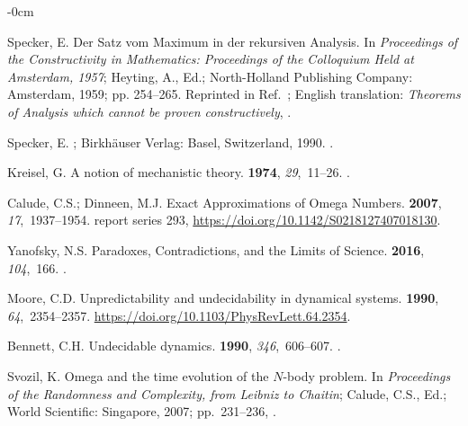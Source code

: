 \documentclass[axioms,article,accept,oneauthor,pdftex]{Definitions/mdpi}
\begin{document}
\begin{adjustwidth}{-\extralength}{0cm}
\begin{thebibliography}{999}
Specker, E.
\newblock Der {S}atz vom {M}aximum in der rekursiven {A}nalysis.
\newblock In \emph{Proceedings of the Constructivity in Mathematics: Proceedings of
  the Colloquium Held at Amsterdam, 1957}; Heyting, A., Ed.; North-Holland
  Publishing Company: Amsterdam, 1959; pp. 254--265.
\newblock Reprinted in Ref.~\cite[pp. 148-159]{specker-ges}; {E}nglish
  translation: {\it Theorems of Analysis which cannot be proven constructively},
.


Specker, E.
; Birkh{\"{a}}user Verlag: Basel, Switzerland, 1990.
.

Kreisel, G.
\newblock A notion of mechanistic theory.
 {\bf 1974}, {\em 29},~11--26.
.

Calude, C.S.; Dinneen, M.J.
\newblock Exact Approximations of Omega Numbers.
 {\bf 2007}, {\em
  17},~1937--1954.
 report series 293,
  {\url{https://doi.org/10.1142/S0218127407018130}}.

Yanofsky, N.S.
\newblock Paradoxes, Contradictions, and the Limits of Science.
 {\bf 2016}, {\em 104},~166.
.

Moore, C.D.
\newblock Unpredictability and undecidability in dynamical systems.
 {\bf 1990}, {\em 64},~2354--2357.
  {\url{https://doi.org/10.1103/PhysRevLett.64.2354}}.

Bennett, C.H.
\newblock Undecidable dynamics.
 {\bf 1990}, {\em 346},~606--607.
.

Svozil, K.
\newblock Omega and the time evolution of the $N$-body problem.
\newblock In \emph{Proceedings of the Randomness and Complexity, from {L}eibniz to
  {C}haitin}; Calude, C.S., Ed.; World Scientific: Singapore,  2007; pp.~231--236, %
.


\end{thebibliography}
\end{adjustwidth}
\end{document}
